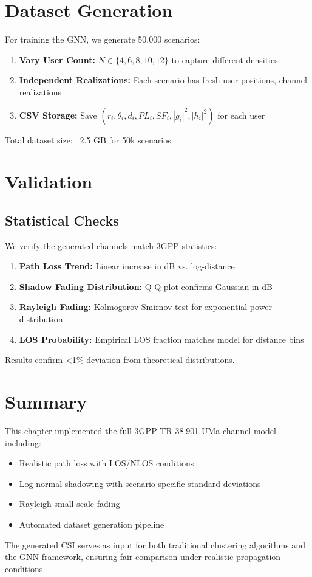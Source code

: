 \section{Dataset Generation}

For training the GNN, we generate 50,000 scenarios:

\begin{enumerate}
    \item \textbf{Vary User Count:} $N \in \{4, 6, 8, 10, 12\}$ to capture different densities
    \item \textbf{Independent Realizations:} Each scenario has fresh user positions, channel realizations
    \item \textbf{CSV Storage:} Save $(r_i, \theta_i, d_i, PL_i, SF_i, |g_i|^2, |h_i|^2)$ for each user
\end{enumerate}

Total dataset size: ~2.5 GB for 50k scenarios.

\section{Validation}

\subsection{Statistical Checks}

We verify the generated channels match 3GPP statistics:

\begin{enumerate}
    \item \textbf{Path Loss Trend:} Linear increase in dB vs. log-distance
    \item \textbf{Shadow Fading Distribution:} Q-Q plot confirms Gaussian in dB
    \item \textbf{Rayleigh Fading:} Kolmogorov-Smirnov test for exponential power distribution
    \item \textbf{LOS Probability:} Empirical LOS fraction matches model for distance bins
\end{enumerate}

Results confirm <1\% deviation from theoretical distributions.

\section{Summary}

This chapter implemented the full 3GPP TR 38.901 UMa channel model including:
\begin{itemize}
    \item Realistic path loss with LOS/NLOS conditions
    \item Log-normal shadowing with scenario-specific standard deviations
    \item Rayleigh small-scale fading
    \item Automated dataset generation pipeline
\end{itemize}

The generated CSI serves as input for both traditional clustering algorithms and the GNN framework, ensuring fair comparison under realistic propagation conditions.
